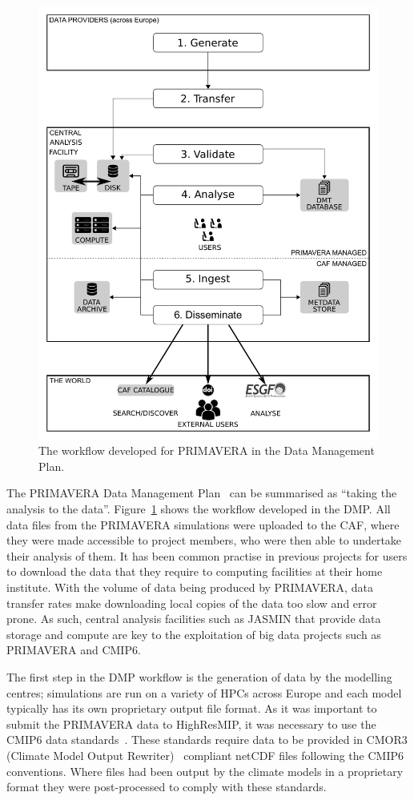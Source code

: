 \documentclass[gmd, manuscript]{copernicus}
\begin{document}
\begin{figure}[t]
\includegraphics[width=12cm]{fig01.pdf}
\caption{The workflow developed for PRIMAVERA in the Data Management Plan.}
\label{dmp_workflow}
\end{figure}

The PRIMAVERA Data Management Plan~\citep{Mizielinski2016} can be summarised as ``taking the analysis to the data''. Figure~\ref{dmp_workflow} shows the workflow developed in the DMP. All data files from the PRIMAVERA simulations were uploaded to the CAF, where they were made accessible to project members, who were then able to undertake their analysis of them. It has been common practise in previous projects for users to download the data that they require to computing facilities at their home institute. With the volume of data being produced by PRIMAVERA, data transfer rates make downloading local copies of the data too slow and error prone. As such, central analysis facilities such as JASMIN that provide data storage and compute are key to the exploitation of big data projects such as PRIMAVERA and CMIP6.

The first step in the DMP workflow is the generation of data by the modelling centres; simulations are run on a variety of HPCs across Europe and each model typically has its own proprietary output file format. As it was important to submit the PRIMAVERA data to HighResMIP, it was necessary to use the CMIP6 data standards~\citep{gmd-11-3659-2018}. These standards require data to be provided in CMOR3 (Climate Model Output Rewriter)~\citep{Nadeau2019} compliant netCDF files following the CMIP6 conventions. Where files had been output by the climate models in a proprietary format they were post-processed to comply with these standards.
\end{document}
